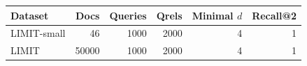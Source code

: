\begin{tabular}{lrrrrr}
\toprule
Dataset & Docs & Queries & Qrels & Minimal $d$ & Recall@2 \\
\midrule
LIMIT-small & 46 & 1000 & 2000 & 4 & 1 \\
LIMIT & 50000 & 1000 & 2000 & 4 & 1 \\
\bottomrule
\end{tabular}

